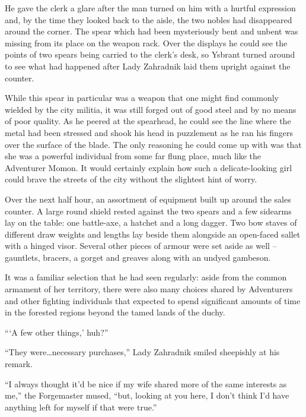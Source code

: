  

He gave the clerk a glare after the man turned on him with a hurtful expression and, by the time they looked back to the aisle, the two nobles had disappeared around the corner. The spear which had been mysteriously bent and unbent was missing from its place on the weapon rack. Over the displays he could see the points of two spears being carried to the clerk’s desk, so Ysbrant turned around to see what had happened after Lady Zahradnik laid them upright against the counter.

 

While this spear in particular was a weapon that one might find commonly wielded by the city militia, it was still forged out of good steel and by no means of poor quality. As he peered at the spearhead, he could see the line where the metal had been stressed and shook his head in puzzlement as he ran his fingers over the surface of the blade. The only reasoning he could come up with was that she was a powerful individual from some far flung place, much like the Adventurer Momon. It would certainly explain how such a delicate-looking girl could brave the streets of the city without the slightest hint of worry.

 

Over the next half hour, an assortment of equipment built up around the sales counter. A large round shield rested against the two spears and a few sidearms lay on the table: one battle-axe, a hatchet and a long dagger. Two bow staves of different draw weights and lengths lay beside them alongside an open-faced sallet with a hinged visor. Several other pieces of armour were set aside as well – gauntlets, bracers, a gorget and greaves along with an undyed gambeson.

 

It was a familiar selection that he had seen regularly: aside from the common armament of her territory, there were also many choices shared by Adventurers and other fighting individuals that expected to spend significant amounts of time in the forested regions beyond the tamed lands of the duchy.

 

“‘A few other things,’ huh?”

 

“They were…necessary purchases,” Lady Zahradnik smiled sheepishly at his remark.

 

“I always thought it’d be nice if my wife shared more of the same interests as me,” the Forgemaster mused, “but, looking at you here, I don’t think I’d have anything left for myself if that were true.”

